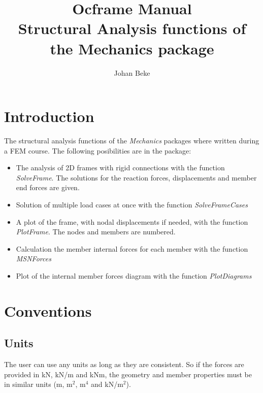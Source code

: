 \documentclass[a4paper]{article}
\title{Ocframe Manual  \\ {\large  Structural Analysis functions of the Mechanics package}}
\author{Johan Beke}
\begin{document}
\maketitle

\tableofcontents

\section{Introduction}
	\begin{sloppypar}
	The structural analysis functions of the \emph{Mechanics} packages where written during a FEM course. The following posibilities are in the package:
		\begin{itemize}
			\item The analysis of 2D frames with rigid connections with the function {\emph{SolveFrame}}.
			The solutions for the reaction forces, displacements and member end forces are given.
			\item Solution of multiple load cases at once with the function \emph{SolveFrameCases}
			\item A plot of the frame, with nodal displacements if needed, with the function \emph{PlotFrame}. The nodes and members are numbered.
			\item Calculation the member internal forces for each member with the function \emph{MSNForces}
			\item Plot of the internal member forces diagram with the function \emph{PlotDiagrams}
		\end{itemize}
	\end{sloppypar}
\section{Conventions}
	\subsection{Units}
		\begin{sloppypar}
		The user can use any units as long as they are consistent. So if the forces are provided 
		in kN, kN/m and kNm, the geometry and member properties must be in similar units (m, m$^2$, m$^4$ and kN/m$^2$). 
		\end{sloppypar}
\end{document}
